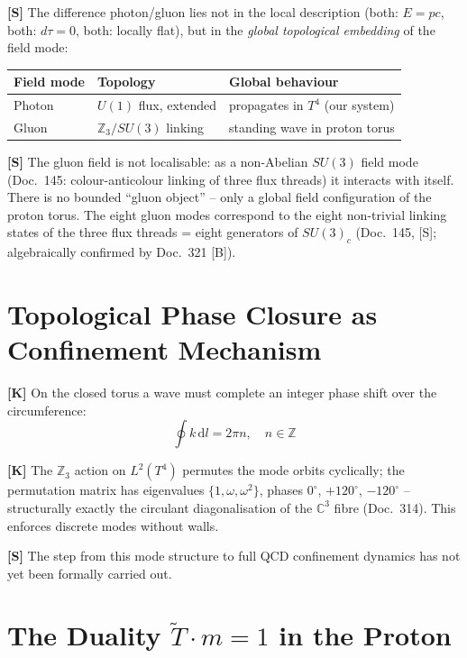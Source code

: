 \textbf{[S]} The difference photon/gluon lies not in the local
description (both: $E=pc$, both: $d\tau=0$, both: locally flat), but
in the \emph{global topological embedding} of the field mode:

\begin{center}
\begin{tabular}{lll}
\toprule
Field mode & Topology & Global behaviour \\
\midrule
Photon & $U(1)$ flux, extended & propagates in $T^4$ (our system) \\
Gluon & $\mathbb{Z}_3/SU(3)$ linking & standing wave in proton torus \\
\bottomrule
\end{tabular}
\end{center}

\textbf{[S]} The gluon field is not localisable: as a non-Abelian
$SU(3)$ field mode (Doc.~145: colour-anticolour linking of three flux
threads) it interacts with itself. There is no bounded ``gluon object''
-- only a global field configuration of the proton torus. The eight
gluon modes correspond to the eight non-trivial linking states of the
three flux threads = eight generators of $SU(3)_c$ (Doc.~145, [S];
algebraically confirmed by Doc.~321 [B]).

\section{Topological Phase Closure as Confinement Mechanism}

\textbf{[K]} On the closed torus a wave must complete an integer phase
shift over the circumference:
\begin{equation}
  \oint k \, \mathrm{d}l = 2\pi n, \quad n \in \mathbb{Z}
\end{equation}

\textbf{[K]} The $\mathbb{Z}_3$ action on $L^2(T^4)$ permutes the
mode orbits cyclically; the permutation matrix has eigenvalues
$\{1, \omega, \omega^2\}$, phases $0^\circ$, $+120^\circ$,
$-120^\circ$ -- structurally exactly the circulant diagonalisation of
the $\mathbb{C}^3$ fibre (Doc.~314). This enforces discrete modes
without walls.

\textbf{[S]} The step from this mode structure to full QCD confinement
dynamics has not yet been formally carried out.

\section{The Duality $\tilde{T} \cdot m = 1$ in the Proton}

